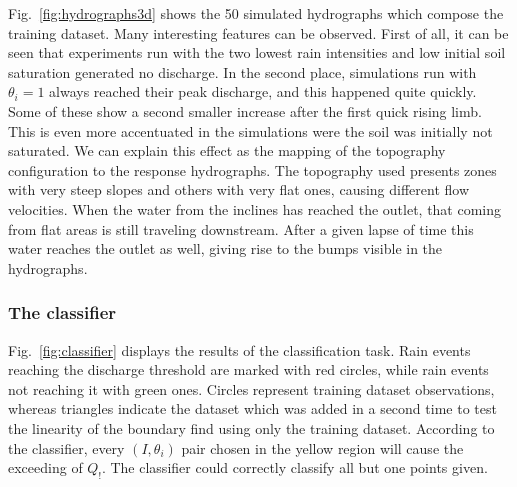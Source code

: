 Fig.~\ref{fig:hydrographs3d} shows the \num{50} simulated hydrographs which compose the training dataset.
Many interesting features can be observed.
First of all, it can be seen that experiments run with the two lowest rain intensities and low initial soil saturation generated no discharge.
In the second place, simulations run with $\theta_i = \num{1}$ always reached their peak discharge, and this happened quite quickly.
Some of these show a second smaller increase after the first quick rising limb.
This is even more accentuated in the simulations were the soil was initially not saturated.
We can explain this effect as the mapping of the topography configuration to the response hydrographs.
The topography used presents zones with very steep slopes and others with very flat ones, causing different flow velocities.
When the water from the inclines has reached the outlet, that coming from flat areas is still traveling downstream.
After a given lapse of time this water reaches the outlet as well, giving rise to the bumps visible in the hydrographs.\\

\subsubsection{The classifier}\label{sec:classifier}

Fig.~\ref{fig:classifier} displays the results of the classification task.
Rain events reaching the discharge threshold are marked with red circles, while rain events not reaching it with green ones. Circles represent training dataset observations, whereas triangles indicate the dataset which was added in a second time to test the linearity of the boundary find using only the training dataset.
According to the classifier, every $(I, \theta_i)$ pair chosen in the yellow region will cause the exceeding of $Q_!$. The classifier could correctly classify all but one points given.

